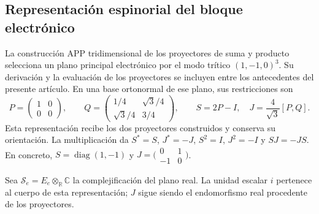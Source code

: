 \subsection{Representación espinorial del bloque electrónico}
\label{vi:subsec:spin-electron}

La construcción APP tridimensional de los proyectores de suma y
producto selecciona un plano principal electrónico por el modo
trítico $(1,-1,0)^3$. Su derivación y la evaluación de los
proyectores se incluyen entre los antecedentes del presente
artículo. En una base ortonormal de ese plano, sus restricciones
son
\begin{equation}
 P=\begin{pmatrix}1&0\\0&0\end{pmatrix},\qquad
 Q=\begin{pmatrix}1/4&\sqrt3/4\\\sqrt3/4&3/4\end{pmatrix},
 \qquad S=2P-I,\quad J=\frac4{\sqrt3}[P,Q].
 \label{vi:eq:bloque-electronico}
\end{equation}
Esta representación recibe los dos proyectores construidos y
conserva su orientación. La multiplicación da
$S^*=S$, $J^*=-J$, $S^2=I$, $J^2=-I$ y $SJ=-JS$.
En concreto, $S=\operatorname{diag}(1,-1)$ y
$J=\bigl(\begin{smallmatrix}0&1\\-1&0\end{smallmatrix}\bigr)$.

Sea $\mathscr S_e=E_e\otimes_{\mathbb R}\mathbb C$ la
complejificación del plano real. La unidad escalar $i$ pertenece
al cuerpo de esta representación; $J$ sigue siendo el
endomorfismo real procedente de los proyectores.

